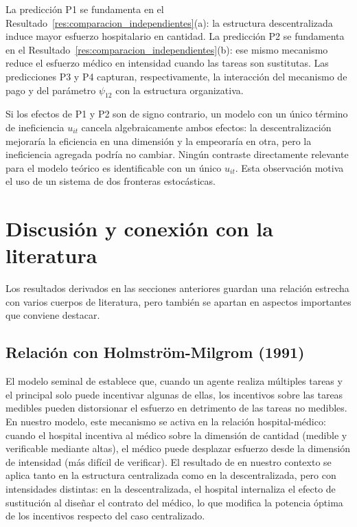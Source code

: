 La predicción P1 se fundamenta en el Resultado~\ref{res:comparacion_independientes}(a): la estructura descentralizada induce mayor esfuerzo hospitalario en cantidad. La predicción P2 se fundamenta en el Resultado~\ref{res:comparacion_independientes}(b): ese mismo mecanismo reduce el esfuerzo médico en intensidad cuando las tareas son sustitutas. Las predicciones P3 y P4 capturan, respectivamente, la interacción del mecanismo de pago y del parámetro $\psi_{12}$ con la estructura organizativa.

\begin{remark}
Si los efectos de P1 y P2 son de signo contrario, un modelo con un único término de ineficiencia $u_{it}$ cancela algebraicamente ambos efectos: la descentralización mejoraría la eficiencia en una dimensión y la empeoraría en otra, pero la ineficiencia agregada podría no cambiar. Ningún contraste directamente relevante para el modelo teórico es identificable con un único $u_{it}$. Esta observación motiva el uso de un sistema de dos fronteras estocásticas.
\end{remark}


\section{Discusión y conexión con la literatura}
\label{sec:discusion_literatura}

Los resultados derivados en las secciones anteriores guardan una relación estrecha con varios cuerpos de literatura, pero también se apartan en aspectos importantes que conviene destacar.

\subsection{Relación con Holmström-Milgrom (1991)}

El modelo seminal de \citet{holmstrom1991} establece que, cuando un agente realiza múltiples tareas y el principal solo puede incentivar algunas de ellas, los incentivos sobre las tareas medibles pueden distorsionar el esfuerzo en detrimento de las tareas no medibles. En nuestro modelo, este mecanismo se activa en la relación hospital-médico: cuando el hospital incentiva al médico sobre la dimensión de cantidad (medible y verificable mediante altas), el médico puede desplazar esfuerzo desde la dimensión de intensidad (más difícil de verificar). El resultado de \citet{holmstrom1991} en nuestro contexto se aplica tanto en la estructura centralizada como en la descentralizada, pero con intensidades distintas: en la descentralizada, el hospital internaliza el efecto de sustitución al diseñar el contrato del médico, lo que modifica la potencia óptima de los incentivos respecto del caso centralizado.

